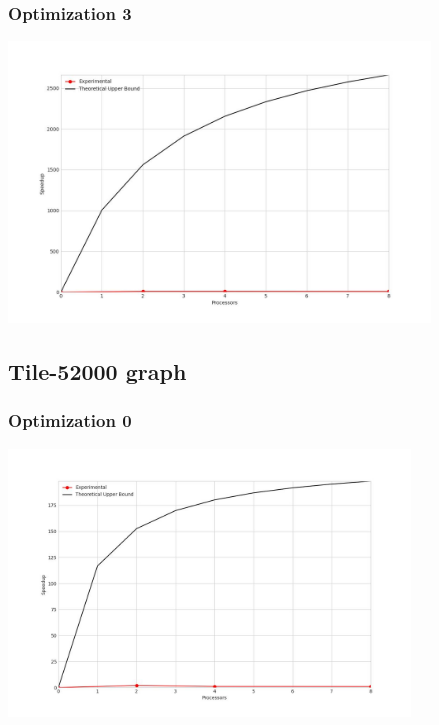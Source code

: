 \subsubsection{Optimization 3}
\begin{center}
    \resizebox{0.95\textwidth}{!}{}
    \includegraphics[width=0.84\textwidth]{../img/speedup-graph_type-random-500000-O3}
\end{center}

\clearpage
\subsection{Tile-52000 graph}
\subsubsection{Optimization 0}
\begin{center}
    \resizebox{0.95\textwidth}{!}{}
    \includegraphics[width=0.8\textwidth]{../img/speedup-graph_type-tile-52000-O0}
\end{center}

